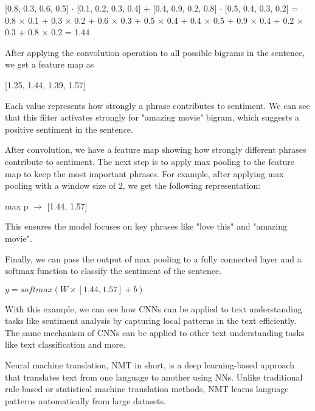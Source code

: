 \documentclass[10pt]{article}
\begin{document}
\begin{description}
\begin{center}
    [0.8, 0.3, 0.6, 0.5] $\cdot$ [0.1, 0.2, 0.3, 0.4] + [0.4, 0.9, 0.2, 0.8] $\cdot$ [0.5, 0.4, 0.3, 0.2] = 0.8 $\times$ 0.1 + 0.3 $\times$ 0.2 + 0.6 $\times$ 0.3 + 0.5 $\times$ 0.4 + 0.4 $\times$ 0.5 + 0.9 $\times$ 0.4 + 0.2 $\times$ 0.3 + 0.8 $\times$ 0.2 = 1.44
\end{center}

After applying the convolution operation to all possible bigrams in the sentence, we get a feature map as 

\begin{center}
    [1.25, 1.44, 1.39, 1.57]
\end{center}

Each value represents how strongly a phrase contributes to sentiment.
We can see that this filter activates strongly for "amazing movie" bigram, which suggests a positive sentiment in the sentence.

After convolution, we have a feature map showing how strongly different phrases contribute to sentiment.
The next step is to apply max pooling to the feature map to keep the most important phrases.
For example, after applying max pooling with a window size of 2, we get the following representation:

\begin{center}
    max p $\rightarrow$ [1.44, 1.57]
\end{center}

This ensures the model focuses on key phrases like "love this" and "amazing movie".

Finally, we can pass the output of max pooling to a fully connected layer and a softmax function to classify the sentiment of the sentence.

\begin{center}
    $y = softmax(W \times [1.44, 1.57] + b)$
\end{center}

With this example, we can see how CNNs can be applied to text understanding tasks like sentiment analysis by capturing local patterns in the text efficiently.
The same mechanism of CNNs can be applied to other text understanding tasks like text classification and more.

\pagebreak

\item[Problem 6:] \hfill %

Neural machine translation, NMT in short, is a deep learning-based approach that translates text from one language to another using NNs.
Unlike traditional rule-based or statistical machine translation methods, NMT learns language patterns automatically from large datasets.


\end{description}
\end{document}
